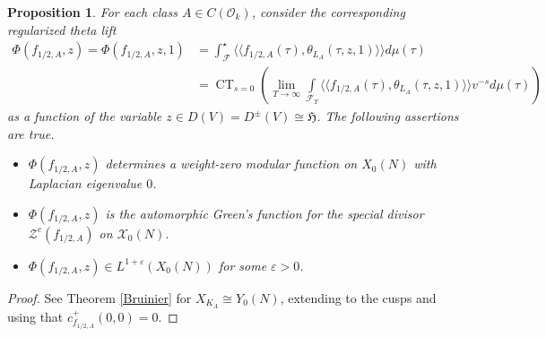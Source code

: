 \documentclass{amsart}
\newtheorem{proposition}[theorem]{Proposition}
\theoremstyle{definition}
\theoremstyle{definition}
\theoremstyle{definition}
\begin{document}
\begin{proposition}

For each class $A \in C(\mathcal{O}_k)$, consider the corresponding regularized theta lift 
\begin{align*} \Phi(f_{1/2, A}, z) = \Phi(f_{1/2, A}, z, 1) &= \int_{\mathcal{F}}^{\star} \langle \langle f_{1/2, A}(\tau), \theta_{L_A}(\tau, z, 1) \rangle \rangle d \mu(\tau) \\
&= \operatorname{CT}_{s=0} \left( \lim_{T \rightarrow \infty} \int\limits_{\mathcal{F}_T}
\langle \langle f_{1/2, A}(\tau), \theta_{L_A}(\tau, z, 1) \rangle \rangle v^{-s} d \mu(\tau) \right) \end{align*}
as a function of the variable $z \in D(V) = D^{\pm}(V) \cong \mathfrak{H}$. The following assertions are true. 

\begin{itemize}

\item[(i)] $\Phi(f_{1/2, A}, z)$ determines a weight-zero modular function on $X_0(N)$ with Laplacian eigenvalue $0$. 

\item[(ii)] $\Phi(f_{1/2, A}, z)$ is the automorphic Green's function for the special divisor $\mathcal{Z}^c(f_{1/2, A})$ on $\mathcal{X}_0(N)$. 

\item[(iii)] $\Phi(f_{1/2, A}, z) \in L^{1+\varepsilon}(X_0(N))$ for some $\varepsilon>0$. 

\end{itemize}

\end{proposition}

\begin{proof} See Theorem \ref{Bruinier} for $X_{K_A} \cong Y_0(N)$, extending to the cusps and using that $c_{f_{1/2, A}}^+(0,0)=0$. \end{proof}
\end{document}
